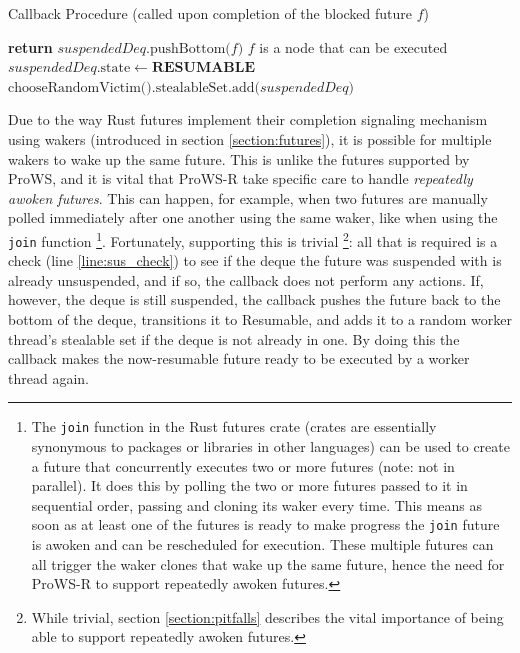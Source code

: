 \documentclass[bsc,frontabs,singlespacing,parskip,deptreport,normalheadings]{infthesis}
\begin{document}
\begin{algorithm}
\caption{Callback Procedure (called upon completion of the blocked future $f$)}
\label{alg:callback}
\begin{algorithmic}[1]
     \label{line:callback}
            \label{line:sus_check}
            \State \textbf{return}
        \EndIf
        \State $suspendedDeq \text{.pushBottom(} f \text{)}$ \Comment $f$ is a node
            that can be executed
        \State $suspendedDeq\text{.state} \gets \textbf{RESUMABLE}$
            \State $\text{chooseRandomVictim().stealableSet.add(} suspendedDeq
                \text{)}$
        \EndIf
    \EndFunction
\end{algorithmic}
\end{algorithm}

Due to the way Rust futures implement their completion signaling mechanism using
wakers (introduced in section \ref{section:futures}), it is possible for
multiple wakers to wake up the same future. This is unlike the futures supported
by ProWS, and it is vital that ProWS-R take specific care to handle
\textit{repeatedly awoken futures}. This can happen, for
example, when two futures are manually polled immediately after one another
using the same waker, like when using the \texttt{join} function \footnote{The
    \texttt{join} function in the Rust futures crate \cite{noauthor_join_nodate}
    (crates are essentially synonymous to packages or libraries in other
    languages) can be used to create a future that concurrently executes two or
    more futures (note: not in parallel). It does this by polling the two or
    more futures passed to it in sequential order, passing and cloning its waker
    every time. This means as soon as at least one of the futures is ready to
    make progress the \texttt{join} future is awoken and can be rescheduled for
    execution. These multiple futures can all trigger the waker clones that wake
    up the same future, hence the need for ProWS-R to support repeatedly awoken
futures.}. Fortunately, supporting this is trivial \footnote{While trivial, section
\ref{section:pitfalls} describes the vital importance of being able to support
repeatedly awoken futures.}: all that is required is a
check (line \ref{line:sus_check}) to see if the deque the future was suspended
with is already unsuspended, and if so, the callback does not perform any
actions. If, however, the deque is still suspended, the callback pushes the
future back to the bottom of the deque, transitions it to Resumable, and adds it
to a random worker thread's stealable set if the deque is not already in one. By
doing this the callback makes the now-resumable future ready to be executed by a
worker thread again.
\end{document}
